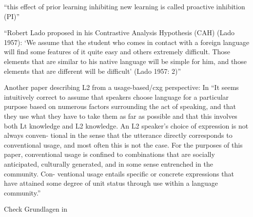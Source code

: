``this effect of prior learning inhibiting
new learning is called proactive inhibition (PI)''

``Robert Lado proposed in his
Contrastive Analysis Hypothesis (CAH) (Lado 1957): ‘We assume that the
student who comes in contact with a foreign language will find some features
of it quite easy and others extremely difficult. Those elements that are similar
to his native language will be simple for him, and those elements that
are different will be difficult’ (Lado 1957: 2)''

Another paper describing L2 from a usage-based/cxg perspective:
In \cite{}
``It seems intuitively correct to assume
that speakers choose language for a particular purpose based on numerous
factors surrounding the act of speaking, and that they use what they have to
take them as far as possible and that this involves both Lt knowledge and
L2 knowledge. An L2 speaker's choice of expression is not always conven-
tional in the sense that the utterance directly corresponds to conventional
usage, and most often this is not the case. For the purposes of this paper,
conventional usage is confined to combinations that are socially anticipated,
culturally generated, and in some sense entrenched in the community. Con-
ventional usage entails specific or concrete expressions that have attained
some degree of unit status through use within a language community.''

Check Grundlagen in \cite{Ziem13}
